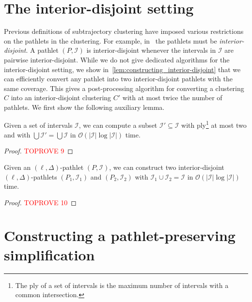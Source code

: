 \documentclass[a4paper,UKenglish,cleveref,thm-restate,notab]{lipics-v2021}
\newcommand{\bigO}{\mathcal{O}}
\newcommand{\I}{\mathcal{I}}
\begin{document}


\appendix

\section{The interior-disjoint setting}

    Previous definitions of subtrajectory clustering have imposed various restrictions on the pathlets in the clustering. 
    For example, in~\cite{buchin_detecting_2011, buchin2017clustering,buchin_improved_2020, gudmundsson2022cubic} the pathlets must be \emph{interior-disjoint}.
    A pathlet $(P, \I)$ is interior-disjoint whenever the intervals in $\I$ are pairwise interior-disjoint.
    While we do not give dedicated algorithms for the interior-disjoint setting, we show in~\cref{lem:constructing_interior-disjoint} that we can efficiently convert any pathlet into two interior-disjoint pathlets with the same coverage.
    This gives a post-processing algorithm for converting a clustering $C$ into an interior-disjoint clustering $C'$ with at most twice the number of pathlets.
    We first show the following auxiliary lemma.

    \begin{lemma}
    \label{lem:reducing_ply}
        Given a set of intervals $\I$, we can compute a subset $\I' \subseteq \I$ with ply\footnote{
            The ply of a set of intervals is the maximum number of intervals with a common intersection.
        } at most two and with $\bigcup \I' = \bigcup \I$ in $\bigO(|\I| \log |\I|)$ time.
    \end{lemma}
    \begin{proof}\textcolor{red}{TOPROVE 9}\end{proof}

    \begin{lemma}
    \label{lem:constructing_interior-disjoint}
        Given an $(\ell, \Delta)$-pathlet $(P, \I)$, we can construct two interior-disjoint $(\ell, \Delta)$-pathlets $(P_1, \I_1)$ and $(P_2, \I_2)$ with $\I_1 \cup \I_2 = \I$ in $\bigO(|\I| \log |\I|)$ time.
    \end{lemma}
    \begin{proof}\textcolor{red}{TOPROVE 10}\end{proof}


\section{Constructing a pathlet-preserving simplification}
\label{app:constructing_pathlet_preserving_simplification}
\end{document}
